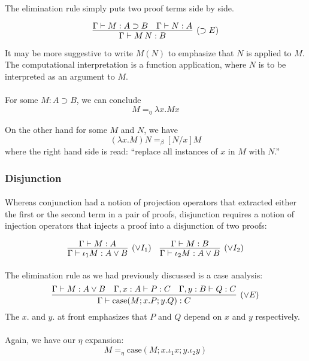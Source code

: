 \documentclass[a4paper]{article}
\begin{document}
\paragraph{}
The elimination rule simply puts two proof terms side by side.

$$\infer[(\supset E)]{\Gamma \vdash M\,N : B}{\Gamma \vdash M : A \supset B &
\Gamma \vdash N : A}$$

It may be more suggestive to write $M(N)$ to emphasize that $N$ is applied to
$M$. The computational interpretation is a function application, where $N$ is to
be interpreted as an argument to $M$.

\paragraph{}
For some $M  : A \supset B$, we can conclude
$$M =_{\eta} \lambda x. M x$$

On the other hand for some $M$ and $N$, we have
$$(\lambda x. M) N =_{\beta} [N/x]M$$
where the right hand side is read: ``replace all instances of $x$ in $M$ with
$N$.''

\subsubsection{Disjunction}
\paragraph{}
Whereas conjunction had a notion of projection operators that extracted either
the first or the second term in a pair of proofs, disjunction requires a notion
of injection operators that injects a proof into a disjunction of two proofs:

\[
  \infer[(\lor I_1)]{\Gamma \vdash \iota_1 M : A \lor B}{\Gamma \vdash M : A} \quad
  \infer[(\lor I_2)]{\Gamma \vdash \iota_2 M : A \lor B}{\Gamma \vdash M : B}
\]

\paragraph{}
The elimination rule as we had previously discussed is a case analysis:
$$\infer[(\lor E)]{\Gamma \vdash \text{case}(M; x.P; y.Q) : C}{\Gamma \vdash M : A
\lor B & \Gamma, x : A \vdash P : C & \Gamma, y : B \vdash Q : C}$$
The $x.$ and $y.$ at front emphasizes that $P$ and $Q$ depend on $x$ and $y$
respectively.

\paragraph{}
Again, we have our $\eta$ expansion:
$$M =_{\eta} \text{case}(M; x. \iota_1 x; y. \iota_2 y)$$
\end{document}
